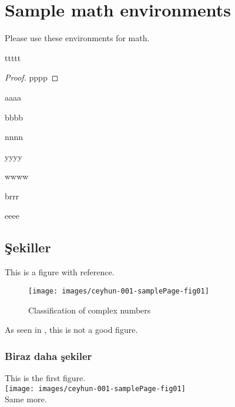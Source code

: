 \documentclass[11pt]{amsbook}
\begin{document}
\section{Sample math environments}
Please use these environments for math.


\begin{theorem}
	ttttt
\end{theorem}
\begin{proof}
	pppp
\end{proof}
\begin{lemma}
	aaaa
\end{lemma}
\begin{proposition}
	bbbb
\end{proposition}
\begin{corollary}
	nnnn
\end{corollary}
\begin{conjecture}
	yyyy
\end{conjecture}
\begin{remark}
	wwww
\end{remark}
\begin{assumption}
	brrr
\end{assumption}
\begin{example}
	eeee
\end{example}




\subsection{Şekiller}
This is a figure with reference.
\begin{figure}[htb]
	\centering
	\texttt{[image: images/ceyhun-001-samplePage-fig01]}
	\caption{Classification of complex numbers}
	\label{fig:classificationOfComplexNumbersA}
\end{figure}

As seen in , this is not a good figure.


\subsubsection{Biraz daha şekiler}

This is the first figure.\\
\texttt{[image: images/ceyhun-001-samplePage-fig01]}\\
Same more.
\end{document}
